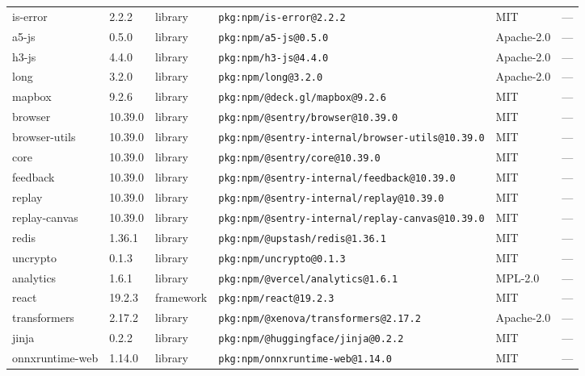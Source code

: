 \documentclass[11pt,a4paper]{article}
\begin{document}
\begin{longtable}{|p{4cm}|p{2cm}|p{1.6cm}|p{5cm}|p{1.5cm}|p{3.5cm}|}
\raggedright is-error & 2.2.2 & library & \small\texttt{pkg:npm/is-error@2.2.2} & MIT & \small — \\
\raggedright a5-js & 0.5.0 & library & \small\texttt{pkg:npm/a5-js@0.5.0} & Apache-2.0 & \small — \\
\raggedright h3-js & 4.4.0 & library & \small\texttt{pkg:npm/h3-js@4.4.0} & Apache-2.0 & \small — \\
\raggedright long & 3.2.0 & library & \small\texttt{pkg:npm/long@3.2.0} & Apache-2.0 & \small — \\
\raggedright mapbox & 9.2.6 & library & \small\texttt{pkg:npm/@deck.gl/mapbox@9.2.6} & MIT & \small — \\
\raggedright browser & 10.39.0 & library & \small\texttt{pkg:npm/@sentry/browser@10.39.0} & MIT & \small — \\
\raggedright browser-utils & 10.39.0 & library & \small\texttt{pkg:npm/@sentry-internal/browser-utils@10.39.0} & MIT & \small — \\
\raggedright core & 10.39.0 & library & \small\texttt{pkg:npm/@sentry/core@10.39.0} & MIT & \small — \\
\raggedright feedback & 10.39.0 & library & \small\texttt{pkg:npm/@sentry-internal/feedback@10.39.0} & MIT & \small — \\
\raggedright replay & 10.39.0 & library & \small\texttt{pkg:npm/@sentry-internal/replay@10.39.0} & MIT & \small — \\
\raggedright replay-canvas & 10.39.0 & library & \small\texttt{pkg:npm/@sentry-internal/replay-canvas@10.39.0} & MIT & \small — \\
\raggedright redis & 1.36.1 & library & \small\texttt{pkg:npm/@upstash/redis@1.36.1} & MIT & \small — \\
\raggedright uncrypto & 0.1.3 & library & \small\texttt{pkg:npm/uncrypto@0.1.3} & MIT & \small — \\
\raggedright analytics & 1.6.1 & library & \small\texttt{pkg:npm/@vercel/analytics@1.6.1} & MPL-2.0 & \small — \\
\raggedright react & 19.2.3 & framework & \small\texttt{pkg:npm/react@19.2.3} & MIT & \small — \\
\raggedright transformers & 2.17.2 & library & \small\texttt{pkg:npm/@xenova/transformers@2.17.2} & Apache-2.0 & \small — \\
\raggedright jinja & 0.2.2 & library & \small\texttt{pkg:npm/@huggingface/jinja@0.2.2} & MIT & \small — \\
\raggedright onnxruntime-web & 1.14.0 & library & \small\texttt{pkg:npm/onnxruntime-web@1.14.0} & MIT & \small — \\

\end{longtable}
\end{document}
